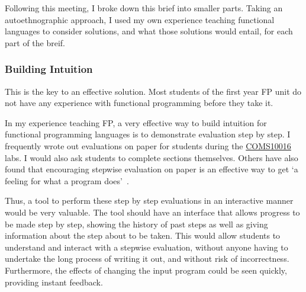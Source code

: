 Following this meeting, I broke down this brief into smaller parts. Taking an autoethnographic approach, I used my own experience teaching functional languages to consider solutions, and what those solutions would entail, for each part of the breif. 

\subsubsection{Building Intuition}
\label{building_intuition}
This is the key to an effective solution. Most students of the first year \ac{FP} unit do not have any experience with functional programming before they take it. 



In my experience teaching \ac{FP}, a very effective way to build intuition for functional programming languages is to demonstrate evaluation step by step. I frequently wrote out evaluations on paper for students during the \hyperref[COMS10016]{COMS10016} labs. I would also ask students to complete sections themselves. Others have also found that encouraging stepwise evaluation on paper is an effective way to get `a feeling for what a program does'~\cite{fp_first_year}.

Thus, a tool to perform these step by step evaluations in an interactive manner would be very valuable. The tool should have an interface that allows progress to be made step by step, showing the history of past steps as well as giving information about the step about to be taken. This would allow students to understand and interact with a stepwise evaluation, without anyone having to undertake the long process of writing it out, and without risk of incorrectness. Furthermore, the effects of changing the input program could be seen quickly, providing instant feedback. 

